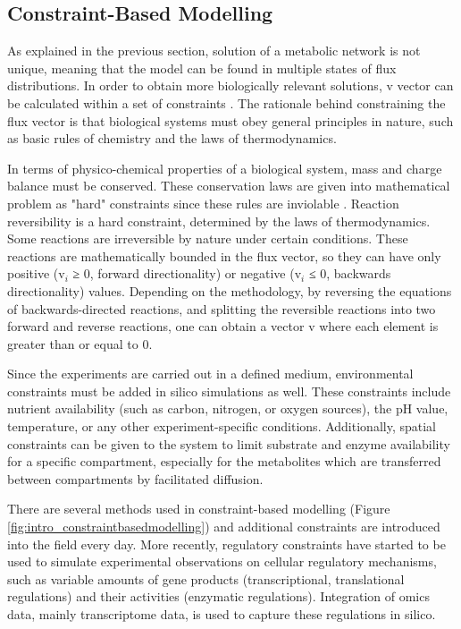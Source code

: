 \subsection{Constraint-Based Modelling}
As explained in the previous section, solution of a metabolic network is not unique, meaning that the model can be found in multiple states of flux distributions. In order to obtain more biologically relevant solutions, v vector can be calculated within a set of constraints \cite{thiele2007bringing}. The rationale behind constraining the flux vector is that biological systems must obey general principles in nature, such as basic rules of chemistry and the laws of thermodynamics.

In terms of physico-chemical properties of a biological system, mass and charge balance must be conserved. These conservation laws are given into mathematical problem as "hard" constraints since these rules are inviolable \cite{price2004genome}. Reaction reversibility is a hard constraint, determined by the laws of thermodynamics. Some reactions are irreversible by nature under certain conditions. These reactions are mathematically bounded in the flux vector, so they can have only positive (v$_i$ ≥ 0, forward directionality) or negative (v$_i$ ≤ 0, backwards directionality) values. Depending on the methodology, by reversing the equations of backwards-directed reactions, and splitting the reversible reactions into two forward and reverse reactions, one can obtain a vector v where each element is greater than or equal to 0.

Since the experiments are carried out in a defined medium, environmental constraints must be added in silico simulations as well. These constraints include nutrient availability (such as carbon, nitrogen, or oxygen sources), the pH value, temperature, or any other experiment-specific conditions. Additionally, spatial constraints can be given to the system to limit substrate and enzyme availability for a specific compartment, especially for the metabolites which are transferred between compartments by facilitated diffusion.


There are several methods used in constraint-based modelling (Figure \ref{fig:intro_constraintbasedmodelling}) and additional constraints are introduced into the field every day. More recently, regulatory constraints have started to be used to simulate experimental observations on cellular regulatory mechanisms, such as variable amounts of gene products (transcriptional, translational regulations) and their activities (enzymatic regulations). Integration of omics data, mainly transcriptome data, is used to capture these regulations in silico.


